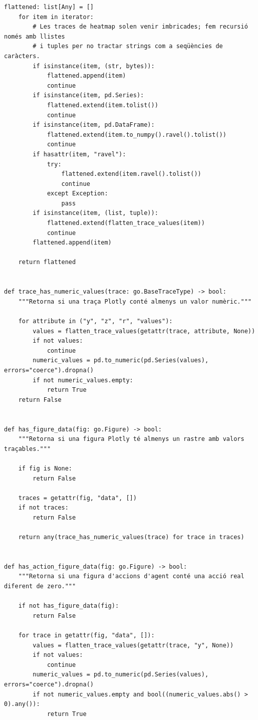\documentclass[10pt,a4paper]{article}
\begin{document}
\begin{lstlisting}[style=studioPython,caption={backend/resultats\_backend.py},label={lst:backend-resultats-backend-py}]
    flattened: list[Any] = []
    for item in iterator:
        # Les traces de heatmap solen venir imbricades; fem recursió només amb llistes
        # i tuples per no tractar strings com a seqüències de caràcters.
        if isinstance(item, (str, bytes)):
            flattened.append(item)
            continue
        if isinstance(item, pd.Series):
            flattened.extend(item.tolist())
            continue
        if isinstance(item, pd.DataFrame):
            flattened.extend(item.to_numpy().ravel().tolist())
            continue
        if hasattr(item, "ravel"):
            try:
                flattened.extend(item.ravel().tolist())
                continue
            except Exception:
                pass
        if isinstance(item, (list, tuple)):
            flattened.extend(flatten_trace_values(item))
            continue
        flattened.append(item)

    return flattened


def trace_has_numeric_values(trace: go.BaseTraceType) -> bool:
    """Retorna si una traça Plotly conté almenys un valor numèric."""

    for attribute in ("y", "z", "r", "values"):
        values = flatten_trace_values(getattr(trace, attribute, None))
        if not values:
            continue
        numeric_values = pd.to_numeric(pd.Series(values), errors="coerce").dropna()
        if not numeric_values.empty:
            return True
    return False


def has_figure_data(fig: go.Figure) -> bool:
    """Retorna si una figura Plotly té almenys un rastre amb valors traçables."""

    if fig is None:
        return False

    traces = getattr(fig, "data", [])
    if not traces:
        return False

    return any(trace_has_numeric_values(trace) for trace in traces)


def has_action_figure_data(fig: go.Figure) -> bool:
    """Retorna si una figura d'accions d'agent conté una acció real diferent de zero."""

    if not has_figure_data(fig):
        return False

    for trace in getattr(fig, "data", []):
        values = flatten_trace_values(getattr(trace, "y", None))
        if not values:
            continue
        numeric_values = pd.to_numeric(pd.Series(values), errors="coerce").dropna()
        if not numeric_values.empty and bool((numeric_values.abs() > 0).any()):
            return True


\end{lstlisting}
\end{document}
